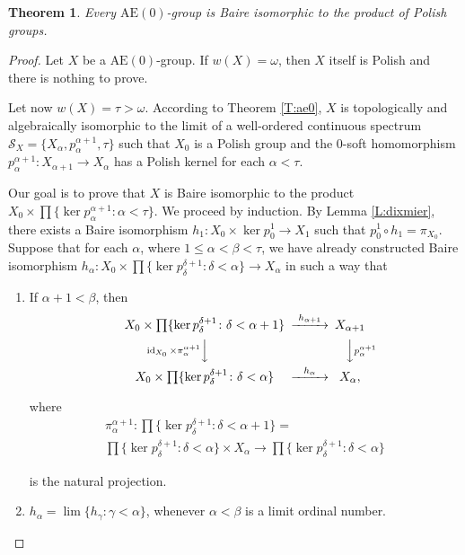 \documentclass[12pt,draft]{amsart}
\theoremstyle{plain}
\newtheorem{thm}{Theorem}[section]
\theoremstyle{definition}
\numberwithin{equation}{section}
\begin{document}
\begin{thm}\label{T:baire}
Every $\text{AE}(0)$-group is Baire isomorphic to the product of Polish groups.
\end{thm}
\begin{proof}
Let $X$ be a $\text{AE}(0)$-group. If $w(X) = \omega$, then $X$ itself is Polish
and there is nothing to prove.

Let now $w(X) = \tau > \omega$. According to Theorem \ref{T:ae0},
$X$ is topologically and algebraically isomorphic to the limit of a
well-ordered continuous spectrum
${\mathcal S}_{X} = \{ X_{\alpha}, p_{\alpha}^{\alpha +1}, \tau \}$
such that $X_{0}$ is a Polish group and the $0$-soft homomorphism
$p_{\alpha}^{\alpha +1} \colon X_{\alpha +1} \to X_{\alpha}$ has a
Polish kernel for each $\alpha < \tau$.

Our goal is to prove that $X$ is Baire isomorphic to the product
$\displaystyle X_{0} \times \prod\{
\ker p_{\alpha}^{\alpha +1} \colon \alpha < \tau\}$. We proceed by induction.
By Lemma \ref{L:dixmier}, there exists a Baire isomorphism
$h_{1} \colon X_{0} \times \ker p_{0}^{1} \to X_{1}$ such
that $p_{0}^{1} \circ h_{1} = \pi_{X_{0}}$.
Suppose that for each $\alpha$, where $1 \leq \alpha < \beta < \tau$, we
have already constructed Baire isomorphism
$\displaystyle h_{\alpha} \colon X_{0} \times \prod\{
\ker p_{\delta}^{\delta +1}\colon \delta < \alpha\} \to X_{\alpha}$
in such a way that
\begin{enumerate}
\item
If $\alpha + 1 < \beta$, then
\[
\begin{CD}
X_{0} \times \prod\{ \ker p_{\delta}^{\delta +1}\colon \delta <
\alpha +1\} @>h_{\alpha +1}>> X_{\alpha +1}\\
@V{\operatorname{id}_{X_{0}}\times \pi_{\alpha}^{\alpha +1}}VV @VV
{p_{\alpha}^{\alpha +1}}V\\
X_{0}\times \prod\{ \ker p_{\delta}^{\delta +1}\colon
\delta < \alpha\} @>h_{\alpha}>> X_{\alpha},
\end{CD}
\]

\noindent where 
\begin{multline*}
 \pi_{\alpha}^{\alpha +1} \colon \prod\{ \ker
p_{\delta}^{\delta +1}\colon \delta < \alpha +1\}  =\\
\prod\{ \ker p_{\delta}^{\delta +1}\colon \delta < \alpha\}
\times X_{\alpha} \to \prod\{ \ker
p_{\delta}^{\delta +1}\colon \delta < \alpha\}
\end{multline*}

\noindent is the natural projection.
\item
$h_{\alpha} = \lim\{ h_{\gamma} \colon \gamma < \alpha\}$, whenever
$\alpha <\beta$ is a limit ordinal number.
\end{enumerate} 


\end{proof}
\end{document}
